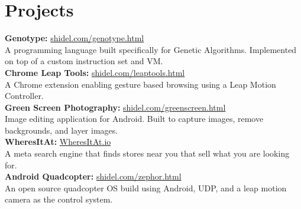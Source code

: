 \documentclass[10pt]{article}
\begin{document}
{\begin{minipage}[t]{0.5\textwidth}
\section{Projects} 

\textbf{Genotype:} \hfill \href{http://shidel.com/genotype.html}{shidel.com/genotype.html}
\vspace{0.5 mm}\\
A programming language built specifically for Genetic Algorithms.  Implemented on top of a custom instruction set and VM. \\


\textbf{Chrome Leap Tools:} \hfill \href{http://shidel.com/leaptools.html}{shidel.com/leaptools.html}
\vspace{0.5 mm}\\
A Chrome extension enabling gesture based browsing using a Leap Motion Controller.\\

\textbf{Green Screen Photography:} \hfill \href{http://shidel.com/greenscreen.html}{shidel.com/greenscreen.html}
\vspace{0.5 mm}\\
Image editing application for Android. Built to capture images, remove backgrounds, and
layer images. \\

\textbf{WheresItAt:} \hfill \href{http://WheresItAt.io}{WheresItAt.io}
\vspace{0.5 mm}\\
A meta search engine that finds stores near you that sell what you are looking for. \\

\textbf{Android Quadcopter:} \hfill \href{http://shidel.com/zephor.html}{shidel.com/zephor.html}
\vspace{0.5 mm}\\
An open source quadcopter OS build using Android, UDP, and a leap motion camera as the control system. \\



\end{minipage}}
\end{document}
